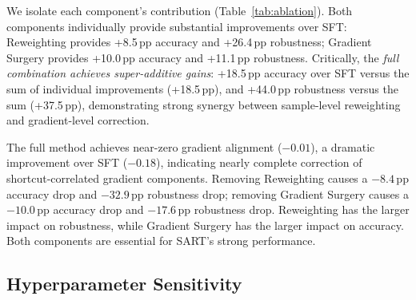 We isolate each component's contribution (Table~\ref{tab:ablation}). Both components individually provide substantial improvements over SFT: Reweighting provides +8.5\,pp accuracy and +26.4\,pp robustness; Gradient Surgery provides +10.0\,pp accuracy and +11.1\,pp robustness. Critically, the \emph{full combination achieves super-additive gains}: +18.5\,pp accuracy over SFT versus the sum of individual improvements (+18.5\,pp), and +44.0\,pp robustness versus the sum (+37.5\,pp), demonstrating strong synergy between sample-level reweighting and gradient-level correction.

The full method achieves near-zero gradient alignment ($-0.01$), a dramatic improvement over SFT ($-0.18$), indicating nearly complete correction of shortcut-correlated gradient components. Removing Reweighting causes a $-8.4$\,pp accuracy drop and $-32.9$\,pp robustness drop; removing Gradient Surgery causes a $-10.0$\,pp accuracy drop and $-17.6$\,pp robustness drop. Reweighting has the larger impact on robustness, while Gradient Surgery has the larger impact on accuracy. Both components are essential for SART's strong performance.

\subsection{Hyperparameter Sensitivity}
\label{sec:exp_sensitivity}

